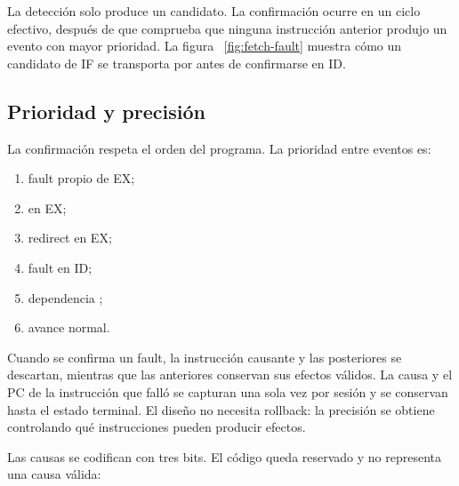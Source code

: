 La detección solo produce un candidato. La confirmación ocurre en un ciclo
efectivo, después de que  comprueba que ninguna
instrucción anterior produjo un evento con mayor prioridad. La figura
~\ref{fig:fetch-fault} muestra cómo un candidato de IF se transporta por
 antes de confirmarse en ID.

\subsection{Prioridad y precisión}

La confirmación respeta el orden del programa. La prioridad entre eventos es:

\begin{enumerate}
  \item fault propio de EX;
  \item {} en EX;
  \item redirect en EX;
  \item fault en ID;
  \item dependencia ;
  \item avance normal.
\end{enumerate}

Cuando se confirma un fault, la instrucción causante y las posteriores se
descartan, mientras que las anteriores conservan sus efectos válidos. La causa
y el PC de la instrucción que falló se capturan una sola vez por sesión y se
conservan hasta el estado terminal. El diseño no necesita rollback: la
precisión se obtiene controlando qué instrucciones pueden producir efectos.

Las causas se codifican con tres bits. El código  queda reservado y
no representa una causa válida:


